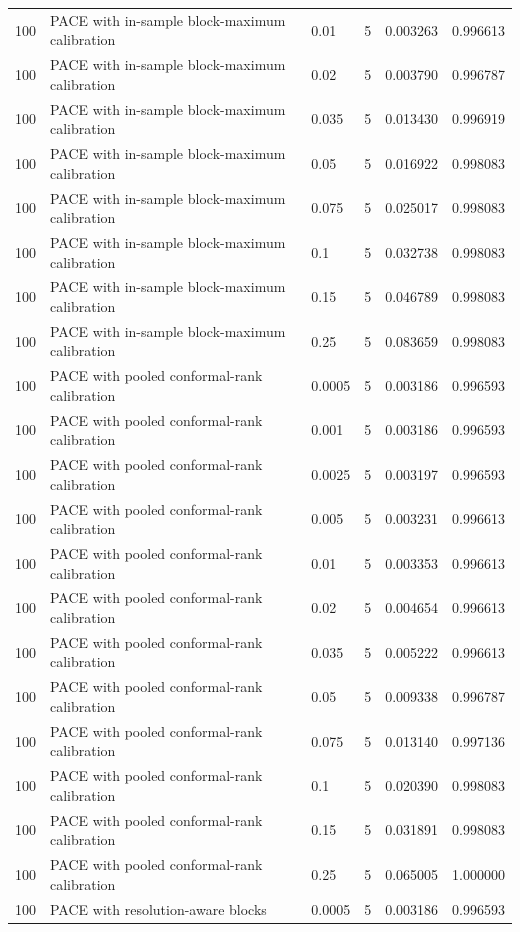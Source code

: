 \begin{tabular}{llllll}
100 & PACE with in-sample block-maximum calibration & 0.01 & 5 & 0.003263 & 0.996613 \\
100 & PACE with in-sample block-maximum calibration & 0.02 & 5 & 0.003790 & 0.996787 \\
100 & PACE with in-sample block-maximum calibration & 0.035 & 5 & 0.013430 & 0.996919 \\
100 & PACE with in-sample block-maximum calibration & 0.05 & 5 & 0.016922 & 0.998083 \\
100 & PACE with in-sample block-maximum calibration & 0.075 & 5 & 0.025017 & 0.998083 \\
100 & PACE with in-sample block-maximum calibration & 0.1 & 5 & 0.032738 & 0.998083 \\
100 & PACE with in-sample block-maximum calibration & 0.15 & 5 & 0.046789 & 0.998083 \\
100 & PACE with in-sample block-maximum calibration & 0.25 & 5 & 0.083659 & 0.998083 \\
100 & PACE with pooled conformal-rank calibration & 0.0005 & 5 & 0.003186 & 0.996593 \\
100 & PACE with pooled conformal-rank calibration & 0.001 & 5 & 0.003186 & 0.996593 \\
100 & PACE with pooled conformal-rank calibration & 0.0025 & 5 & 0.003197 & 0.996593 \\
100 & PACE with pooled conformal-rank calibration & 0.005 & 5 & 0.003231 & 0.996613 \\
100 & PACE with pooled conformal-rank calibration & 0.01 & 5 & 0.003353 & 0.996613 \\
100 & PACE with pooled conformal-rank calibration & 0.02 & 5 & 0.004654 & 0.996613 \\
100 & PACE with pooled conformal-rank calibration & 0.035 & 5 & 0.005222 & 0.996613 \\
100 & PACE with pooled conformal-rank calibration & 0.05 & 5 & 0.009338 & 0.996787 \\
100 & PACE with pooled conformal-rank calibration & 0.075 & 5 & 0.013140 & 0.997136 \\
100 & PACE with pooled conformal-rank calibration & 0.1 & 5 & 0.020390 & 0.998083 \\
100 & PACE with pooled conformal-rank calibration & 0.15 & 5 & 0.031891 & 0.998083 \\
100 & PACE with pooled conformal-rank calibration & 0.25 & 5 & 0.065005 & 1.000000 \\
100 & PACE with resolution-aware blocks & 0.0005 & 5 & 0.003186 & 0.996593 \\

\end{tabular}
